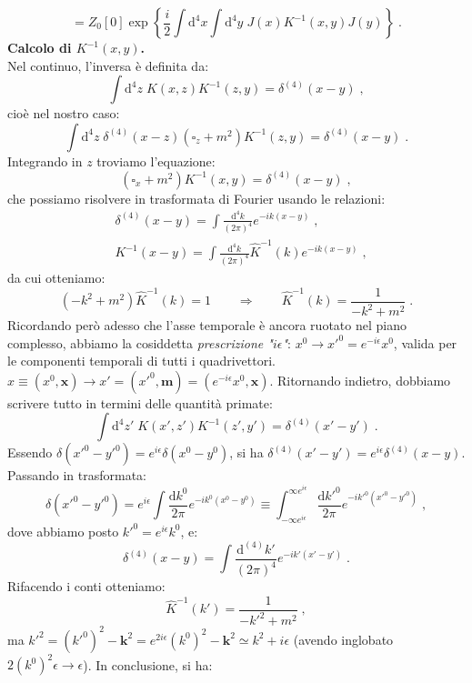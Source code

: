 \documentclass[12pt,a4paper]{article}
\theoremstyle{definition}
\newcommand{\diff}[1][]{\mathrm{d}#1}
\numberwithin{equation}{section}
\begin{document}
\begin{equation}
=Z_0[0]\exp\left\{\frac{i}{2}\int\diff^4{x}\int\diff^4{y}\;J(x)K^{-1}(x,y)J(y)\right\}\;.
\end{equation}
\textbf{Calcolo di $K^{-1}(x,y)$.} \\
Nel continuo, l'inversa è definita da:
\begin{equation}
\int\diff^4{z}\;K(x,z)K^{-1}(z,y)=\delta^{(4)}(x-y)\;,
\end{equation}
cioè nel nostro caso:
\begin{equation}
\int\diff^4{z}\;\delta^{(4)}(x-z)(\square_z+m^2)K^{-1}(z,y)=\delta^{(4)}(x-y)\;.
\end{equation}
Integrando in $z$ troviamo l'equazione:
\begin{equation}
(\square_x+m^2)K^{-1}(x,y)=\delta^{(4)}(x-y)\;,
\end{equation}
che possiamo risolvere in trasformata di Fourier usando le relazioni:
\begin{align}
&\delta^{(4)}(x-y)=\int\frac{\diff^4{k}}{(2\pi)^4}e^{-ik(x-y)}\;, \\
&K^{-1}(x-y)=\int\frac{\diff^4{k}}{(2\pi)^4}\hat{K}^{-1}(k)e^{-ik(x-y)}\;,
\end{align}
da cui otteniamo:
\begin{equation}
(-k^2+m^2)\hat{K}^{-1}(k)=1\qquad \Longrightarrow\qquad \hat{K}^{-1}(k)=\frac{1}{-k^2+m^2}\;.
\end{equation}
Ricordando però adesso che l'asse temporale è ancora ruotato nel piano complesso, abbiamo la cosiddetta \emph{prescrizione "$i\epsilon$"}: $x^0\to x'^0=e^{-i\epsilon}x^0$, valida per le componenti temporali di tutti i quadrivettori. $x\equiv (x^0,\mathbf{x})\longrightarrow x'=(x'^0,\mathbf{m})=(e^{-i\epsilon}x^0,\mathbf{x})$. Ritornando indietro, dobbiamo scrivere tutto in termini delle quantità primate:
\begin{equation}
\int\diff^4{z'}\;K(x',z')K^{-1}(z',y')=\delta^{(4)}(x'-y')\;.
\end{equation}
Essendo $\delta(x'^0-y'^0)=e^{i\epsilon}\delta(x^0-y^0)$, si ha $\delta^{(4)}(x'-y')=e^{i\epsilon}\delta^{(4)}(x-y)$. Passando in trasformata:
$$
\delta(x'^0-y'^0)=e^{i\epsilon}\int\frac{\diff{k}^0}{2\pi}e^{-ik^0(x^0-y^0)}\equiv\int_{-\infty e^{i\epsilon}}^{\infty e^{i\epsilon}}\frac{\diff{k'}^0}{2\pi}e^{-ik'^0(x'^0-y'^0)}\;,
$$
dove abbiamo posto $k'^0=e^{i\epsilon}k^0$, e:
$$
\delta^{(4)}(x-y)=\int\frac{\diff^{(4)}{k'}}{(2\pi)^4}e^{-ik'(x'-y')}\;.
$$
Rifacendo i conti otteniamo:
$$
\hat{K}^{-1}(k')=\frac{1}{-k'^2+m^2}\;,
$$
ma $k'^2=(k'^0)^2-\mathbf{k}^2=e^{2i\epsilon}(k^0)^2-\mathbf{k}^2\simeq k^2+i\epsilon$ (avendo inglobato $2(k^0)^2\epsilon\to\epsilon$). In conclusione, si ha:
\end{document}
